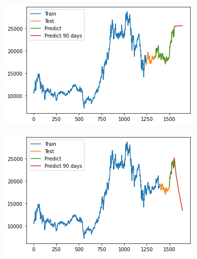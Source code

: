 \documentclass[conference]{IEEEtran}
\begin{document}
\begin{minipage}{0.23\textwidth}
    \centering
    \includegraphics[width=\linewidth]{images/RNN/RNN_MBB_90days_82.png}
    \label{fig:image1}
\end{minipage}
\hfill
\begin{minipage}{0.23\textwidth}
    \centering
    \includegraphics[width=\linewidth]{images/RNN/RNN_MBB_90days_91.png}
    \label{fig:image2}
\end{minipage}
\end{document}
